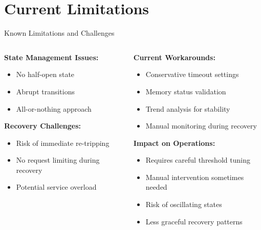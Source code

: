 \documentclass[aspectratio=169]{beamer}
\newcommand{\alertred}[1]{\textcolor{red}{#1}}
\begin{document}
\section{Current Limitations}

\begin{frame}{Known Limitations and Challenges}
    \begin{columns}
        \begin{column}{0.5\textwidth}
            \textbf{State Management Issues:}
            \begin{itemize}
                \item[\alertred{\faTimes}] No half-open state
                \item[\alertred{\faTimes}] Abrupt transitions
                \item[\alertred{\faTimes}] All-or-nothing approach
            \end{itemize}
            
            \vspace{0.3cm}
            \textbf{Recovery Challenges:}
            \begin{itemize}
                \item[\alertred{\faTimes}] Risk of immediate re-tripping
                \item[\alertred{\faTimes}] No request limiting during recovery
                \item[\alertred{\faTimes}] Potential service overload
            \end{itemize}
        \end{column}
        \begin{column}{0.5\textwidth}
            \textbf{Current Workarounds:}
            \begin{itemize}
                \item Conservative timeout settings
                \item Memory status validation
                \item Trend analysis for stability
                \item Manual monitoring during recovery
            \end{itemize}
            
            \vspace{0.3cm}
            \textbf{Impact on Operations:}
            \begin{itemize}
                \item Requires careful threshold tuning
                \item Manual intervention sometimes needed
                \item Risk of oscillating states
                \item Less graceful recovery patterns
            \end{itemize}
        \end{column}
    \end{columns}
    

\end{frame}
\end{document}
